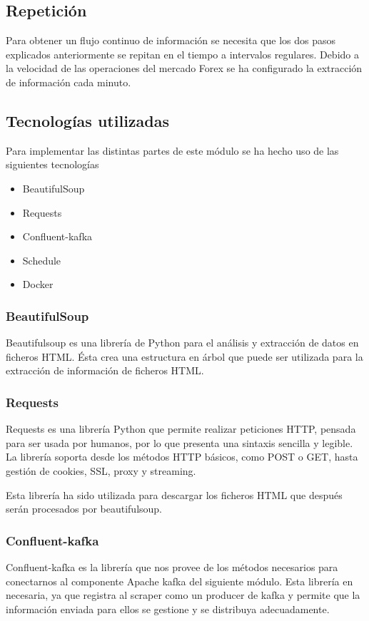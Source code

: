 \subsection{Repetición}
Para obtener un flujo continuo de información se necesita que los dos pasos explicados anteriormente se repitan en el tiempo a intervalos regulares. Debido a la velocidad de las operaciones del mercado Forex se ha configurado la extracción de información cada minuto.

\subsection{Tecnologías utilizadas}
Para implementar las distintas partes de este módulo se ha hecho uso de las siguientes tecnologías
\begin{itemize}
\item BeautifulSoup
\item Requests
\item Confluent-kafka
\item Schedule
\item Docker
\end{itemize}
\pagebreak
\subsubsection*{BeautifulSoup}
Beautifulsoup es una librería de Python para el análisis y extracción de datos en ficheros HTML.
Ésta crea una estructura en árbol que puede ser utilizada para la extracción de información de ficheros HTML.


\subsubsection*{Requests}
Requests es una librería Python que permite realizar peticiones HTTP,  pensada para ser usada por humanos, por lo que presenta una sintaxis sencilla y legible. La librería soporta desde los métodos HTTP básicos, como POST o GET, hasta gestión de cookies, SSL, proxy y streaming.

Esta librería ha sido utilizada para descargar los ficheros HTML que después serán procesados por beautifulsoup.

\subsubsection*{Confluent-kafka}
Confluent-kafka es la librería que nos provee de los métodos necesarios para conectarnos al componente Apache kafka del siguiente módulo. Esta librería en necesaria, ya que registra al scraper como un producer de kafka y permite que la información enviada para ellos se gestione y se distribuya adecuadamente.

